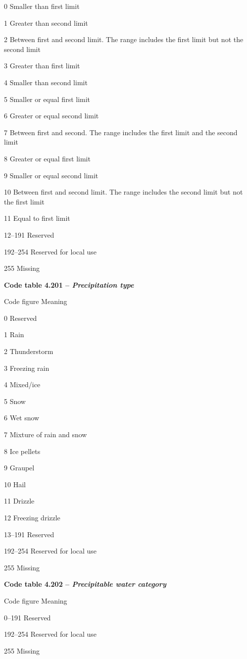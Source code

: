 0 Smaller than first limit

1 Greater than second limit

2 Between first and second limit. The range includes the first limit but not the second limit

3 Greater than first limit

4 Smaller than second limit

5 Smaller or equal first limit

6 Greater or equal second limit

7 Between first and second. The range includes the first limit and the second limit

8 Greater or equal first limit

9 Smaller or equal second limit

10 Between first and second limit. The range includes the second limit but not the first limit

11 Equal to first limit

12--191 Reserved

192--254 Reserved for local use

255 Missing

\textbf{Code table 4.201 -- \emph{Precipitation type}}

Code figure Meaning

0 Reserved

1 Rain

2 Thunderstorm

3 Freezing rain

4 Mixed/ice

5 Snow

6 Wet snow

7 Mixture of rain and snow

8 Ice pellets

9 Graupel

10 Hail

11 Drizzle

12 Freezing drizzle

13--191 Reserved

192--254 Reserved for local use

255 Missing

\textbf{Code table 4.202 -- \emph{Precipitable water category}}

Code figure Meaning

0--191 Reserved

192--254 Reserved for local use

255 Missing


